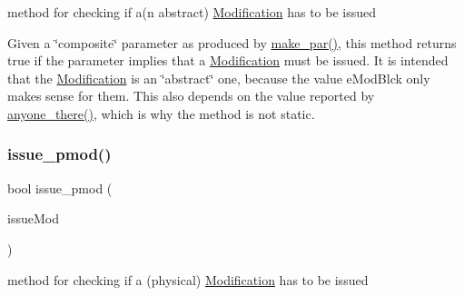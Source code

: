 method for checking if a(n abstract) \mbox{\hyperlink{class_s_m_spp__di__unipi__it_1_1_modification}{Modification}} has to be issued 

Given a \char`\"{}composite\char`\"{} parameter as produced by \mbox{\hyperlink{class_s_m_spp__di__unipi__it_1_1_observer_a2d499ae38e5e95cf66cd71da32b0694a}{make\+\_\+par()}}, this method returns true if the parameter implies that a \mbox{\hyperlink{class_s_m_spp__di__unipi__it_1_1_modification}{Modification}} must be issued. It is intended that the \mbox{\hyperlink{class_s_m_spp__di__unipi__it_1_1_modification}{Modification}} is an \char`\"{}abstract\char`\"{} one, because the value e\+Mod\+Blck only makes sense for them. This also depends on the value reported by \mbox{\hyperlink{class_s_m_spp__di__unipi__it_1_1_observer_a7d8dd42bea99dfdb6fb967ba17993560}{anyone\+\_\+there()}}, which is why the method is not static. \mbox{\label{class_s_m_spp__di__unipi__it_1_1_observer_adbb3f266845b94b3cc19a549c2634f3d}} 
\subsubsection{\texorpdfstring{issue\+\_\+pmod()}{issue\_pmod()}}
{\footnotesize\ttfamily bool issue\+\_\+pmod (\begin{DoxyParamCaption}\item[{\mbox{\hyperlink{group___modification___t_y_p_e_s_ga544246d8c462e9a2d817c2c30797968f}{c\+\_\+\+Mod\+Param}}}]{issue\+Mod }\end{DoxyParamCaption})\hspace{0.3cm}{\ttfamily [inline]}}



method for checking if a (physical) \mbox{\hyperlink{class_s_m_spp__di__unipi__it_1_1_modification}{Modification}} has to be issued 

